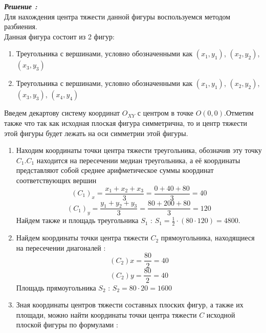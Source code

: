 \documentclass[a4paper,11pt]{article}
\begin{document}
 	\begin{flushleft}
	\textbf{\textit{Решение :}}
	\\ 	
 	\hangindent=1cm  \noindent
 		Для нахождения центра тяжести данной фигуры воспользуемся методом разбиения.	\\
 		Данная фигура состоит из 2 фигур:
 		\begin{enumerate}
 			\item Треугольника с вершинами, условно обозначенными как $(x_1,y_1)$, $(x_2,y_2)$, $(x_3,y_3)$
 			\item Треугольника с вершинами, условно обозначенными как $(x_1,y_1)$, $(x_2,y_2)$, $(x_3,y_3)$, $(x_4,y_4)$
 		\end{enumerate}
 		Введем декартову систему координат $O_{XY}$ с центром в точке $O (0,0)$.Отметим также что так как исходная плоская фигура симметрична, то и центр тяжести этой фигуры будет лежать на оси симметрии этой фигуры.  
 		\begin{enumerate}[label=\Roman{*}, ref=(\roman{*})]
 			\item Находим координаты точки центра тяжести треугольника, обозначив эту точку $C_1$.$C_1$ находится на пересечении медиан треугольника, а её координаты представляют собой среднее арифметическое суммы координат соответствующих вершин
 			\newpage
 			\begin{equation}
 				(C_1)_x = \frac{x_1+x_2+x_3}{3} = \frac{0+40+80}{3} = 40
 			\end{equation}
 			\begin{equation}
 				(C_1)_y = \frac{y_1+y_2+y_3}{3} = \frac{80+200+80}{3} = 120 
\end{equation}
 		Найдем также и площадь треугольника ${S_1}$ : ${S_1 = \frac{1}{2}\cdot(80\cdot120)} = 4800$. 
 		\item Найдем координаты точки центра тяжести ${C_2}$ прямоугольника, находящиеся на пересечении диагоналей :
 			\begin{equation}
 				(C_2)x = \frac{80}{2} = 40
			\end{equation}
			 \begin{equation}
 				(C_2)y = \frac{80}{2} = 40
			\end{equation}
			Площадь прямоугольника ${S_2}$ : ${S_2 = 80\cdot20=1600}$  							\item
			Зная координаты центров тяжести составных плоских фигур, а также их площади, можно найти координаты точки центра тяжести ${C}$ исходной плоской фигуры по формулами :
			\begin{equation}

\end{equation}
\end{enumerate}
\end{flushleft}
\end{document}
